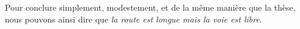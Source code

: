 \documentclass[11pt]{article}
\begin{document}
Pour conclure simplement, modestement, et de la même manière que la thèse, nous pouvons ainsi dire que \textit{la route est longue mais la voie est libre}.











%
\end{document}
